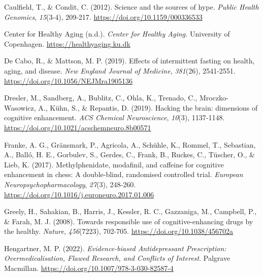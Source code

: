 \documentclass[authordate, reflection,issue]{jote-new-article}
\begin{document}
Caulfield, T., \& Condit, C. (2012). Science and the sources of hype. \emph{Public Health Genomics}, \emph{15}(3-4), 209-217. \url{https://doi.org/10.1159/000336533}







Center for Healthy Aging (n.d.). \emph{Center for Healthy Aging. }University of Copenhagen. \url{https://healthyaging.ku.dk}







De Cabo, R., \& Mattson, M. P. (2019). Effects of intermittent fasting on health, aging, and disease. \emph{New England Journal of Medicine}, \emph{381}(26), 2541-2551. \url{https://doi.org/10.1056/NEJMra1905136}







Dresler, M., Sandberg, A., Bublitz, C., Ohla, K., Trenado, C., Mroczko-Wasowicz, A., Kühn, S., \& Repantis, D. (2019). Hacking the brain: dimensions of cognitive enhancement. \emph{ACS Chemical Neuroscience}, \emph{10}(3), 1137-1148. \url{https://doi.org/10.1021/acschemneuro.8b00571}







Franke, A. G., Gränsmark, P., Agricola, A., Schühle, K., Rommel, T., Sebastian, A., Balló, H. E., Gorbulev, S., Gerdes, C., Frank, B., Ruckes, C., Tüscher, O., \& Lieb, K. (2017). Methylphenidate, modafinil, and caffeine for cognitive enhancement in chess: A double-blind, randomised controlled trial. \emph{European Neuropsychopharmacology}, \emph{27}(3), 248-260. \url{https://doi.org/10.1016/j.euroneuro.2017.01.006}







Greely, H., Sahakian, B., Harris, J., Kessler, R. C., Gazzaniga, M., Campbell, P., \& Farah, M. J. (2008). Towards responsible use of cognitive-enhancing drugs by the healthy. \emph{Nature}, \emph{456}(7223), 702-705. \url{https://doi.org/10.1038/456702a}







Hengartner, M. P. (2022). \emph{Evidence-biased Antidepressant Prescription: }\emph{Overmedicalisation}\emph{, Flawed Research, and Conflicts of Interest}. Palgrave Macmillan. \url{https://doi.org/10.1007/978-3-030-82587-4}
\end{document}

